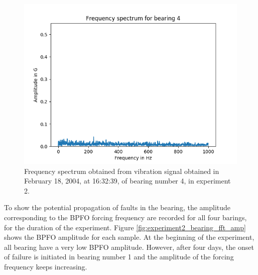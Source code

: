 \documentclass[../Main/thesis.tex]{subfiles}
\begin{document}
\begin{figure}[H] 
   \centering
   \includegraphics[width=4.9in]{../fig/experiment2_bearing4_fft.png} 
   \caption{Frequency spectrum obtained from vibration signal obtained in February 18, 2004, at 16:32:39, of bearing number 4, in experiment 2.}
   \label{fig:bearing4-experiment2-fft}
\end{figure}
\justify
To show the potential propagation of faults in the bearing, the amplitude corresponding to the BPFO forcing frequency are recorded for all four barings, for the duration of the experiment. Figure \ref{fig:experiment2_bearing_fft_amp}  shows the BPFO amplitude for each sample. At the beginning of the experiment, all bearing have a very low BPFO amplitude. However, after four days, the onset of failure is initiated in bearing number 1 and the amplitude of the forcing frequency keeps increasing.
\end{document}
